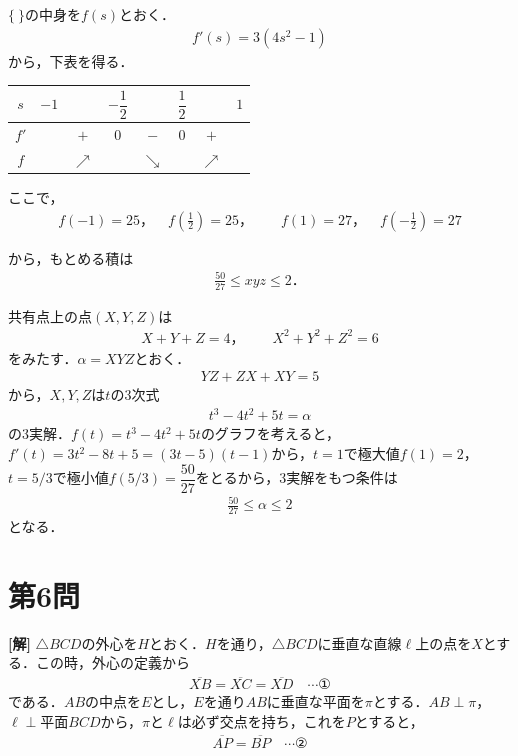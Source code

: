 \documentclass[../main.tex]{subfiles}
\begin{document}
$\{\ \}$の中身を$f(s)$とおく．
\begin{align*}
  f'(s)=3(4s^2-1)
\end{align*}
から，下表を得る．

\begin{center}
  \begin{tabular}{c|ccccccc}
    $s$ & $-1$ & & $-\dfrac12$ & & $\dfrac12$ & & $1$ \\
    \hline
    $f'$ & & $+$ & $0$ & $-$ & $0$ & $+$ & \\
    \hline
    $f$ & & $\nearrow$ & & $\searrow$ & & $\nearrow$ & \\
  \end{tabular}
\end{center}

ここで，
\begin{align*}
  f(-1)=25，\quad f\left(\frac12\right)=25，\qquad f(1)=27，\quad f\left(-\frac12\right)=27
\end{align*}

から，もとめる積は
\begin{align*}
  \frac{50}{27}\le xyz\le2．
\end{align*}

\bigskip
\noindent{\bf [解2]}
共有点上の点$(X,Y,Z)$は
\begin{align*}
  X+Y+Z=4，\qquad X^2+Y^2+Z^2=6
\end{align*}
をみたす．$\alpha=XYZ$とおく．
\begin{align*}
  YZ+ZX+XY=5
\end{align*}
から，$X,Y,Z$は$t$の3次式
\begin{align*}
  t^3-4t^2+5t=\alpha
\end{align*}
の3実解．$f(t)=t^3-4t^2+5t$のグラフを考えると，$f'(t)=3t^2-8t+5=(3t-5)(t-1)$から，$t=1$で極大値$f(1)=2$，$t=5/3$で極小値$f(5/3)=\dfrac{50}{27}$をとるから，3実解をもつ条件は
\begin{align*}
  \frac{50}{27}\le\alpha\le2
\end{align*}
となる．

\newpage

\section*{第6問}

{\bf [解]}
$\triangle BCD$の外心を$H$とおく．$H$を通り，$\triangle BCD$に垂直な直線$\ell$上の点を$X$とする．この時，外心の定義から
\begin{align*}
  \overline{XB}=\overline{XC}=\overline{XD}\quad\cdots①
\end{align*}
である．$AB$の中点を$E$とし，$E$を通り$AB$に垂直な平面を$\pi$とする．$AB\perp\pi$，$\ell\perp$平面$BCD$から，$\pi$と$\ell$は必ず交点を持ち，これを$P$とすると，
\begin{align*}
  \overline{AP}=\overline{BP}\quad\cdots②
\end{align*}
\end{document}
